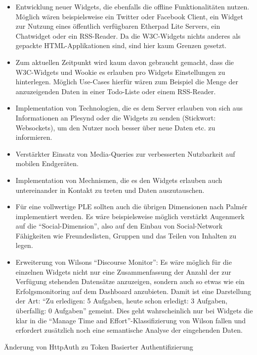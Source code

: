 \begin{itemize}
 \item Entwicklung neuer Widgets, die ebenfalls die offline Funktionalitäten nutzen. Möglich wären beispielsweise ein Twitter oder Facebook Client, ein Widget zur Nutzung eines öffentlich verfügbaren Etherpad Lite Servers, ein Chatwidget oder ein RSS-Reader. Da die W3C-Widgets nichts anderes als gepackte HTML-Applikationen sind, sind hier kaum Grenzen gesetzt.
 \item Zum aktuellen Zeitpunkt wird kaum davon gebraucht gemacht, dass die W3C-Widgets und Wookie es erlauben pro Widgets Einstellungen zu hinterlegen. Möglich Use-Cases hierfür wären zum Beispiel die Menge der anzuzeigenden Daten in einer Todo-Liste oder einem RSS-Reader.
 \item Implementation von Technologien, die es dem Server erlauben von sich aus Informationen an Plesynd oder die Widgets zu senden (Stickwort: Websockets), um den Nutzer noch besser über neue Daten etc. zu informieren.
 \item Verstärkter Einsatz von Media-Queries zur verbesserten Nutzbarkeit auf mobilen Endgeräten.
 \item Implementation von Mechnismen, die es den Widgets erlauben auch untereinander in Kontakt zu treten und Daten auszutauschen.
 \item Für eine vollwertige PLE sollten auch die übrigen Dimensionen nach Palmér implementiert werden. Es wäre beispielsweise möglich verstärkt Augenmerk auf die "`Social-Dimension"', also auf den Einbau von Social-Network Fähigkeiten wie Freundeslisten, Gruppen und das Teilen von Inhalten zu legen.
 \item Erweiterung von Wilsons "`Discourse Monitor"': Es wäre möglich für die einzelnen Widgets nicht nur eine Zusammenfassung der Anzahl der zur Verfügung stehenden Datensätze anzuzeigen, sondern auch so etwas wie ein Erfolgsmonitoring auf dem Dashboard anzubieten. Damit ist eine Darstellung der Art: "`Zu erledigen: 5 Aufgaben, heute schon erledigt: 3 Aufgaben, überfallig: 0 Aufgaben"' gemeint. Dies geht wahrscheinlich nur bei Widgets die klar in die “Manage Time and Effort”-Klassifizierung von Wilson fallen und erfordert zusätzlich noch eine semantische Analyse der eingehenden Daten.
\end{itemize}

Änderung von HttpAuth zu Token Basierter Authentifizierung




